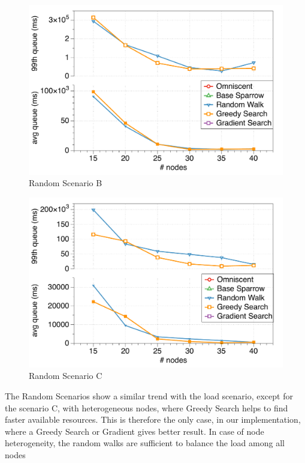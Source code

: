 \documentclass[conference]{IEEEtran}
\begin{document}
\begin{figure}
\begin{center}
\includegraphics[scale=0.45]{figures/randomB}
\caption{Random Scenario B}
\label{fig:comparison}
\end{center}
\end{figure}

\begin{figure}
\begin{center}
\includegraphics[scale=0.45]{figures/randomC}
\caption{Random Scenario C}
\label{fig:comparison}
\end{center}
\end{figure}

The Random Scenarios show a similar trend with the load scenario, except for the scenario C, with heterogeneous nodes, where Greedy Search helps to find faster available resources.
This is therefore the only case, in our implementation, where a Greedy Search or Gradient gives better result. In case of node heterogeneity, the random walks are sufficient to balance the load among all nodes
\end{document}

